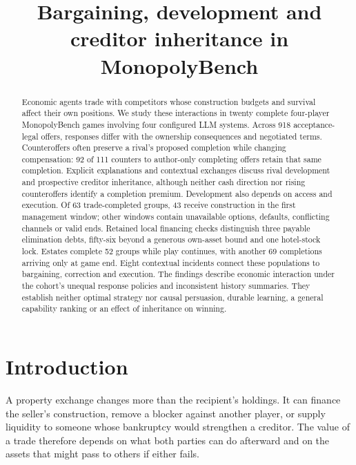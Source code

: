 
\title{Bargaining, development and creditor inheritance in MonopolyBench}
\maketitle
\begin{abstract}
Economic agents trade with competitors whose construction budgets and survival affect their own positions. We study these interactions in twenty complete four-player MonopolyBench games involving four configured LLM systems. Across 918 acceptance-legal offers, responses differ with the ownership consequences and negotiated terms. Counteroffers often preserve a rival's proposed completion while changing compensation: 92 of 111 counters to author-only completing offers retain that same completion. Explicit explanations and contextual exchanges discuss rival development and prospective creditor inheritance, although neither cash direction nor rising counteroffers identify a completion premium. Development also depends on access and execution. Of 63 trade-completed groups, 43 receive construction in the first management window; other windows contain unavailable options, defaults, conflicting channels or valid ends. Retained local financing checks distinguish three payable elimination debts, fifty-six beyond a generous own-asset bound and one hotel-stock lock. Estates complete 52 groups while play continues, with another 69 completions arriving only at game end. Eight contextual incidents connect these populations to bargaining, correction and execution. The findings describe economic interaction under the cohort's unequal response policies and inconsistent history summaries. They establish neither optimal strategy nor causal persuasion, durable learning, a general capability ranking or an effect of inheritance on winning.
\end{abstract}

\section{Introduction}

A property exchange changes more than the recipient's holdings. It can finance the seller's construction, remove a blocker against another player, or supply liquidity to someone whose bankruptcy would strengthen a creditor. The value of a trade therefore depends on what both parties can do afterward and on the assets that might pass to others if either fails.

